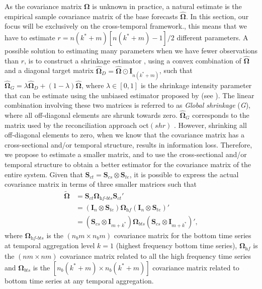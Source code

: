 \documentclass[review, 11pt]{elsarticle}
\newcommand{\Ivet}{\bm{I}}
\newcommand{\Svet}{\bm{S}}
\newcommand{\Omegavet}{\bm{\Omega}}
\theoremstyle{definition}
\begin{document}
As the covariance matrix $\Omegavet$ is unknown in practice, a natural estimate is the empirical sample covariance matrix of the base forecasts $\widehat{\Omegavet}$. In this section, our focus will be exclusively on the cross-temporal framework., this means that we have to estimate $r = n(k^\ast+m)[n(k^\ast+m)-1]/2$ different parameters. A possible solution to estimating many parameters when we have fewer observations than $r$, is to construct a shrinkage estimator \citep{efron1975a,efron1975,efron1977}, using a convex combination of $\widehat{\Omegavet}$ and a diagonal target matrix $\widehat{\Omegavet}_D = \widehat{\Omegavet} \odot \Ivet_{n(k^\ast+m)}$, such that $\widehat{\Omegavet}_{G} = \lambda \widehat{\Omegavet}_D + (1-\lambda) \widehat{\Omegavet}$, where $\lambda \in [0,1]$ is the shrinkage intensity parameter that can be estimate using the unbiased estimator proposed by \cite{ledoit2004a} (see \citealp{schafer2005}). The linear combination involving these two matrices is referred to as \textit{Global shrinkage} (\textit{G}), where all off-diagonal elements are shrunk towards zero. $\widehat{\Omegavet}_{G}$ corresponds to the matrix used by the reconciliation approach oct$(shr)$ \citep{difonzo2023}. However, shrinking all off-diagonal elements to zero, when we know that the covariance matrix has a cross-sectional and/or temporal structure, results in information loss. Therefore, we propose to estimate a smaller matrix, and to use the cross-sectional and/or temporal structure to obtain a better estimator for the covariance matrix of the entire system. Given that $\Svet_{ct} = \Svet_{cs} \otimes \Svet_{te}$, it is possible to express the actual covariance matrix in terms of three smaller matrices such that
\begin{equation}\label{eq:OmSct}
\begin{aligned}
\widetilde{\Omegavet} &= \Svet_{ct}\Omegavet_{\textit{hf-bts}}\Svet_{ct}' \\[-0.25cm]
	&= \left(\Ivet_n \otimes \Svet_{te}\right)\Omegavet_{\textit{hf}}\left(\Ivet_n \otimes \Svet_{te}\right)' \\[-0.25cm]
	&= \left(\Svet_{cs} \otimes \Ivet_{m+k^\ast}\right)\Omegavet_{bts}\left(\Svet_{cs} \otimes \Ivet_{m+k^\ast}\right)',
\end{aligned}
\end{equation}
where $\Omegavet_{\textit{hf-bts}}$ is the $(n_b m\times n_b m)$ covariance matrix for the bottom time series at temporal aggregation level $k = 1$ (highest frequency bottom time series), $\Omegavet_{\textit{hf}}$ is the $(nm\times nm)$ covariance matrix related to all the high frequency time series and $\Omegavet_{bts}$ is the $[n_b(k^\ast + m)\times n_b(k^\ast + m)]$ covariance matrix related to bottom time series at any temporal aggregation.
\end{document}
